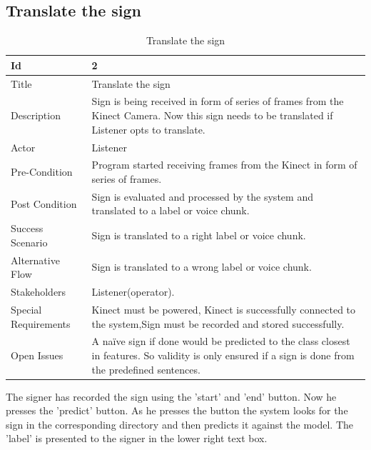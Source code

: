 \subsection{Translate the sign}
\begin{table}[htbp]
	\centering
	
	\caption{Translate the sign}
	\begin{tabular}{ |p{3cm}|p{11cm}| } 
		\hline
		 Id &  2  \\ 
		\hline
		 Title &  Translate the sign  \\ 
		\hline
		 Description &  Sign is being received in form of series of frames from the Kinect Camera. Now this sign needs to be translated if Listener opts to translate.  \\ 
		\hline
		 Actor & Listener \\
		\hline
		 Pre-Condition & Program started receiving frames from the Kinect in form of series of frames.  \\ 
		\hline
		 Post Condition & Sign is evaluated and processed by the system and translated to a label or voice chunk. \\ 
		\hline
		 Success Scenario &  Sign is translated to a right label or voice chunk.  \\ 
		\hline
		 Alternative Flow &  Sign is translated to a wrong label or voice chunk.  \\ 
		\hline
		 Stakeholders &  Listener(operator).   \\ 
		\hline
		 Special Requirements &  Kinect must be powered, Kinect is successfully connected to the system,Sign must be recorded and stored successfully.  \\ 
		\hline
		 Open Issues & A naïve sign if done would be predicted to the class closest in features. So validity is only ensured if a sign is done from the predefined sentences. \\ 
		\hline
	\end{tabular}   
	
\end{table}
The signer has recorded the sign using the 'start' and 'end' button. Now he presses the 'predict' button. As he presses the button the system looks for the sign in the corresponding directory and then predicts it against the model. The 'label' is presented to the signer in the lower right text box. 

\clearpage
